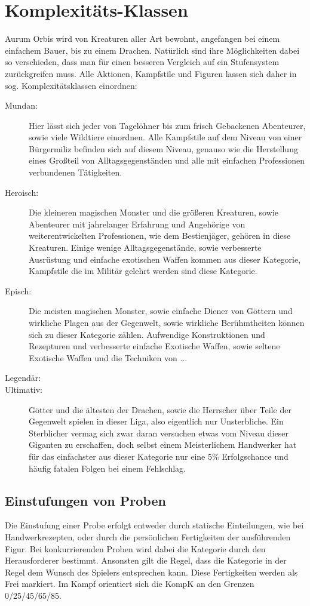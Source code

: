 \documentclass[a4paper,12pt,oneside]{book}
\begin{document}
\chapter{Komplexitäts-Klassen}
Aurum Orbis wird von Kreaturen aller Art bewohnt, angefangen bei einem einfachem Bauer, bis zu einem Drachen. Natürlich sind ihre Möglichkeiten dabei so verschieden, dass man für einen besseren Vergleich auf ein Stufensystem zurückgreifen muss. Alle Aktionen, Kampfstile und Figuren lassen sich daher in sog. Komplexitätsklassen einordnen:
\begin{description}
\item[Mundan:] Hier lässt sich jeder von Tagelöhner bis zum frisch Gebackenen Abenteurer, sowie viele Wildtiere einordnen. Alle Kampfstile auf dem Niveau von einer Bürgermiliz befinden sich auf diesem Niveau, genauso wie die Herstellung eines Großteil von Alltagsgegenständen und alle mit einfachen Professionen verbundenen Tätigkeiten.
\item[Heroisch:] Die kleineren magischen Monster und die größeren Kreaturen, sowie Abenteurer mit jahrelanger Erfahrung und Angehörige von weiterentwickelten Professionen, wie dem Bestienjäger, gehören in diese Kreaturen. Einige wenige Alltagsgegenstände, sowie verbesserte Ausrüstung und einfache exotischen Waffen kommen aus dieser Kategorie, Kampfstile die im Militär gelehrt werden sind diese Kategorie.
\item[Episch:]Die meisten magischen Monster, sowie einfache Diener von Göttern und wirkliche Plagen aus der Gegenwelt, sowie wirkliche Berühmtheiten können sich zu dieser Kategorie zählen. Aufwendige Konstruktionen und Rezepturen und verbesserte einfache Exotische Waffen, sowie seltene Exotische Waffen und die Techniken von ...
\item[Legendär:]
\item[Ultimativ:]Götter und die ältesten der Drachen, sowie die Herrscher über Teile der Gegenwelt spielen in dieser Liga, also eigentlich nur Unsterbliche. Ein Sterblicher vermag sich zwar daran versuchen etwas vom Niveau dieser Giganten zu erschaffen, doch selbst einem Meisterlichem Handwerker hat für das einfachster aus dieser Kategorie nur eine 5\% Erfolgschance und häufig fatalen Folgen bei einem Fehlschlag.
\end{description}

\section{Einstufungen von Proben}
Die Einstufung einer Probe erfolgt entweder durch statische Einteilungen, wie bei Handwerkrezepten, oder durch die persönlichen Fertigkeiten der ausführenden Figur. Bei konkurrierenden Proben wird dabei die Kategorie durch den Herausforderer bestimmt. Ansonsten gilt die Regel, dass die Kategorie in der Regel dem Wunsch des Spielers entsprechen kann. Diese Fertigkeiten werden als Frei markiert. Im Kampf orientiert sich die KompK an den Grenzen 0/25/45/65/85.
\end{document}
